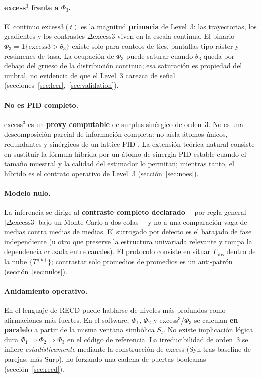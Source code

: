 \documentclass[11pt,a4paper]{article}
\begin{document}
\paragraph{excess$^3$ frente a $\Phi_3$.}
El continuo $\mathrm{excess3}(t)$ es la magnitud \textbf{primaria} de
Level~3: las trayectorias, los gradientes y los contrastes
$\Delta\mathrm{excess3}$ viven en la escala continua. El binario
$\Phi_3=\mathbf{1}\{\mathrm{excess3}>\theta_3\}$ existe solo para conteos
de tics, pantallas tipo r\'aster y res\'umenes de tasa. La ocupaci\'on de
$\Phi_3$ puede saturar cuando $\theta_3$ queda por debajo del grueso de la
distribuci\'on continua; esa saturaci\'on es propiedad del umbral, no
evidencia de que el Level~3 carezca de se\~nal
(secciones~\ref{sec:leer},~\ref{sec:validation}).

\paragraph{No es PID completo.}
excess$^3$ es un \textbf{proxy computable} de surplus sin\'ergico de orden~3.
No es una descomposici\'on parcial de informaci\'on completa: no a\'isla
\'atomos \'unicos, redundantes y sin\'ergicos de un lattice PID
\citep{Williams2010,Bertschinger2014}. La extensi\'on te\'orica natural
consiste en sustituir la f\'ormula h\'ibrida por un \'atomo de sinergia PID
estable cuando el tama\~no muestral y la calidad del estimador lo permitan;
mientras tanto, el h\'ibrido es el contrato operativo de Level~3
(secci\'on~\ref{sec:noes}).

\paragraph{Modelo nulo.}
La inferencia se dirige al \textbf{contraste completo declarado} ---por
regla general $|\Delta\mathrm{excess3}|$ bajo un Monte Carlo a dos
colas--- y no a una comparaci\'on vaga de medias contra medias de medias.
El surrogado por defecto es el barajado de fase independiente (u otro que
preserve la estructura univariada relevante y rompa la dependencia
cruzada entre canales). El protocolo consiste en situar $T_{\mathrm{obs}}$
dentro de la nube $\{T^{(b)}\}$; contrastar solo promedios de promedios
es un anti-patr\'on (secci\'on~\ref{sec:nulos}).

\paragraph{Anidamiento operativo.}
En el lenguaje de RECD puede hablarse de niveles m\'as profundos como
afirmaciones m\'as fuertes. En el software, $\Phi_1$, $\Phi_2$ y
excess$^3$/$\Phi_3$ se calculan \textbf{en paralelo} a partir de la misma
ventana simb\'olica $S_t$. No existe implicaci\'on l\'ogica dura
$\Phi_1\Rightarrow\Phi_2\Rightarrow\Phi_3$ en el c\'odigo de referencia. La
irreducibilidad de orden~3 se infiere \emph{estad\'isticamente} mediante la
construcci\'on de excess (Syn tras baseline de parejas, m\'as Surp), no
forzando una cadena de puertas booleanas (secci\'on~\ref{sec:recd}).
\end{document}
